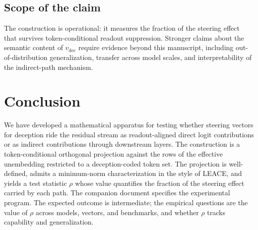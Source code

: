 \documentclass[11pt,letterpaper]{article}
\theoremstyle{plain}
\theoremstyle{definition}
\newcommand{\1}{\mathbf{1}}
\newcommand{\vdec}{v_{\text{dec}}}
\begin{document}
\subsection{Scope of the claim}

The construction is operational: it measures the fraction of the steering effect that survives token-conditional readout suppression. Stronger claims about the semantic content of $\vdec$ require evidence beyond this manuscript, including out-of-distribution generalization, transfer across model scales, and interpretability of the indirect-path mechanism.

\section{Conclusion}\label{sec:conclusion}

We have developed a mathematical apparatus for testing whether steering vectors for deception ride the residual stream as readout-aligned direct logit contributions or as indirect contributions through downstream layers. The construction is a token-conditional orthogonal projection against the rows of the effective unembedding restricted to a deception-coded token set. The projection is well-defined, admits a minimum-norm characterization in the style of LEACE, and yields a test statistic $\rho$ whose value quantifies the fraction of the steering effect carried by each path. The companion document specifies the experimental program. The expected outcome is intermediate; the empirical questions are the value of $\rho$ across models, vectors, and benchmarks, and whether $\rho$ tracks capability and generalization.
\end{document}

